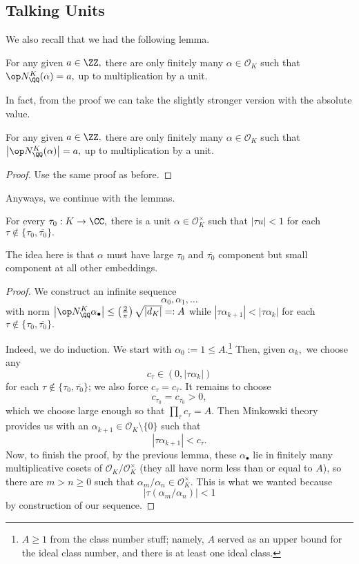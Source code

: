 \documentclass[../notes.tex]{subfiles}
\begin{document}
\subsection{Talking Units}
We also recall that we had the following lemma.
\begin{lemma}
    For any given $a\in\ZZ,$ there are only finitely many $\alpha\in\mathcal O_K$ such that $\op N_\QQ^K(\alpha)=a,$ up to multiplication by a unit.
\end{lemma}
In fact, from the proof we can take the slightly stronger version with the absolute value.
\begin{lemma}
    For any given $a\in\ZZ,$ there are only finitely many $\alpha\in\mathcal O_K$ such that $\left|\op N_\QQ^K(\alpha)\right|=a,$ up to multiplication by a unit.
\end{lemma}
\begin{proof}
    Use the same proof as before.
\end{proof}
Anyways, we continue with the lemmas.
\begin{lemma} \label{lem:makecols}
    For every $\tau_0:K\to\CC,$ there is a unit $\alpha\in\mathcal O_K^\times$ such that $|\tau u|<1$ for each $\tau\notin\{\tau_0,\overline{\tau_0}\}.$
\end{lemma}
The idea here is that $\alpha$ must have large $\tau_0$ and $\overline{\tau_0}$ component but small component at all other embeddings.
\begin{proof}
    We construct an infinite sequence
    \[\alpha_0,\alpha_1,\ldots\]
    with norm $\left|\op N_\QQ^K\alpha_\bullet\right|\le\left(\frac2\pi\right)\sqrt{|d_K|}=:A$ while $|\tau\alpha_{k+1}|<|\tau\alpha_k|$ for each $\tau\notin\{\tau_0,\overline{\tau_0}\}.$

    Indeed, we do induction. We start with $\alpha_0:=1\le A.$\footnote{$A\ge1$ from the class number stuff; namely, $A$ served as an upper bound for the ideal class number, and there is at least one ideal class.} Then, given $\alpha_k,$ we choose any
    \[c_\tau\in(0,|\tau\alpha_k|)\]
    for each $\tau\notin\{\tau_0,\overline{\tau_0}\}$; we also force $c_\tau=c_{\overline\tau}.$ It remains to choose
    \[c_{\tau_0}=c_{\overline{\tau_0}}>0,\]
    which we choose large enough so that $\prod_\tau c_\tau=A.$ Then Minkowski theory provides us with an $\alpha_{k+1}\in\mathcal O_K\setminus\{0\}$ such that
    \[|\tau\alpha_{k+1}|<c_\tau.\]
    Now, to finish the proof, by the previous lemma, these $\alpha_\bullet$ lie in finitely many multiplicative cosets of $\mathcal O_K/\mathcal O_K^\times$ (they all have norm less than or equal to $A$), so there are $m>n\ge0$ such that $\alpha_m/\alpha_n\in\mathcal O_K^\times.$ This is what we wanted because
    \[|\tau(\alpha_m/\alpha_n)|<1\]
    by construction of our sequence.
\end{proof}
\end{document}
